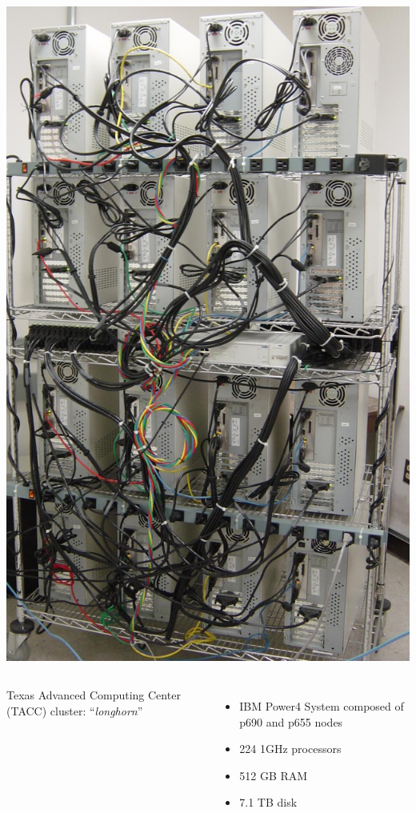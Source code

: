 \documentclass[compress,12pt]{beamer}
\begin{document}
\begin{frame}
{\begin{columns}
       { \centerline{\includegraphics[height=.8\textheight]{figures/bbrox_back}} }
    \end{columns}
  }
  {
    \begin{columns}
      
      Texas Advanced Computing Center (TACC) cluster: ``\emph{longhorn}''
      
      \begin{itemize}
      \item IBM Power4 System composed of p690 and p655 nodes
      \item 224 1GHz processors
      \item 512 GB RAM
      \item 7.1 TB disk
      \end{itemize}


\end{columns}}
\end{frame}
\end{document}
